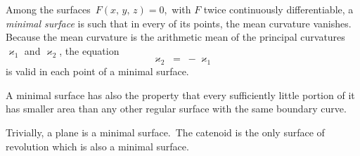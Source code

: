 \documentclass[12pt]{article}
\theoremstyle{definition}
\begin{document}
Among the surfaces \,$F(x,\,y,\,z) = 0$,\, with $F$ twice continuously differentiable, a {\em minimal surface} is such that in every of its points, the mean curvature vanishes.\, Because the mean curvature is the arithmetic mean of the principal curvatures $\varkappa_1$ and $\varkappa_2$, the equation
$$\varkappa_2 \;=\; -\varkappa_1$$
is valid in each point of a minimal surface.

A minimal surface has also the property that every sufficiently little portion of it has smaller area than any other regular surface with the same boundary curve.

Trivially, a plane is a minimal surface.\, The catenoid is the only surface of revolution which is also a minimal surface.
\end{document}
